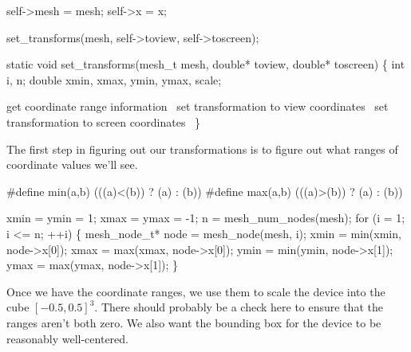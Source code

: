 self->mesh = mesh;
self->x    = x;

set_transforms(mesh, self->toview, self->toscreen);
\nwendcode{}\nwdocspar

\nwenddocs{}\plusendmoddef
static void set_transforms(mesh_t mesh, double* toview, double* toscreen)
\{
    int i, n;
    double xmin, xmax, ymin, ymax, scale;

    \LA{}get coordinate range information~{\nwtagstyle{}}\RA{}
    \LA{}set transformation to view coordinates~{\nwtagstyle{}}\RA{}
    \LA{}set transformation to screen coordinates~{\nwtagstyle{}}\RA{}
\}

\nwendcode{}\nwdocspar

The first step in figuring out our transformations is to figure out
what ranges of coordinate values we'll see.

\nwenddocs{}\endmoddef
#define min(a,b) (((a)<(b)) ? (a) : (b))
#define max(a,b) (((a)>(b)) ? (a) : (b))

\nwendcode{}\nwdocspar

\nwenddocs{}\endmoddef
xmin = ymin = 1;
xmax = ymax = -1;
n = mesh_num_nodes(mesh);
for (i = 1; i <= n; ++i) \{
    mesh_node_t* node = mesh_node(mesh, i);
    xmin = min(xmin, node->x[0]);
    xmax = max(xmax, node->x[0]);
    ymin = min(ymin, node->x[1]);
    ymax = max(ymax, node->x[1]);
\}

\nwendcode{}\nwdocspar

Once we have the coordinate ranges, we use them to scale the device
into the cube $[-0.5, 0.5]^3$.
There should probably be a check here to ensure
that the ranges aren't both zero.  We also want the bounding box for the
device to be reasonably well-centered.

